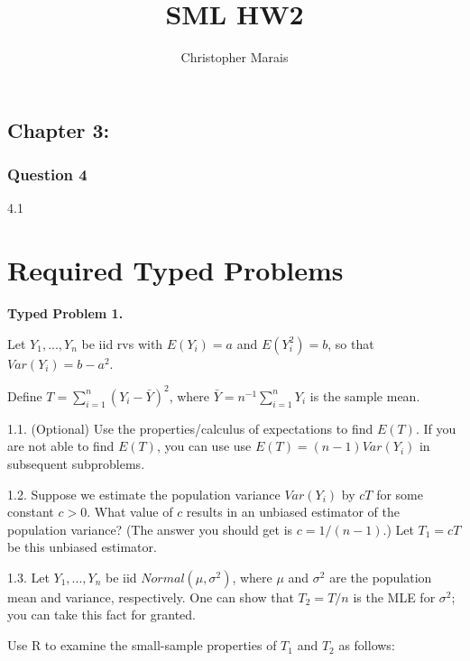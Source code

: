 \documentclass[
  11pt,
]{article}
\title{SML HW2}
\author{Christopher Marais}
\date{}
\begin{document}
\maketitle

\hypertarget{chapter-3}{%
\subsection{Chapter 3:}\label{chapter-3}}

\hypertarget{question-4}{%
\subsubsection{Question 4}\label{question-4}}

4.1

\hypertarget{required-typed-problems}{%
\section{Required Typed Problems}\label{required-typed-problems}}

\textbf{Typed Problem 1.}

Let \(Y_1,...,Y_n\) be iid rvs with \(E(Y_i)=a\) and \(E(Y_i^2)=b\), so
that \(Var(Y_i)=b-a^2\).

Define \(T = \sum_{i=1}^n (Y_i-\bar{Y})^2\), where
\(\bar{Y} = n^{-1}\sum_{i=1}^n Y_i\) is the sample mean.

1.1. (Optional) Use the properties/calculus of expectations to find
\(E(T)\). If you are not able to find \(E(T)\), you can use use
\(E(T) = (n-1)Var(Y_i)\) in subsequent subproblems.

1.2. Suppose we estimate the population variance \(Var(Y_i)\) by \(cT\)
for some constant \(c>0\). What value of \(c\) results in an unbiased
estimator of the population variance? (The answer you should get is
\(c=1/(n-1)\).) Let \(T_1 = cT\) be this unbiased estimator.

1.3. Let \(Y_1,...,Y_n\) be iid \(Normal(\mu,\sigma^2)\), where \(\mu\)
and \(\sigma^2\) are the population mean and variance, respectively. One
can show that \(T_2 = T/n\) is the MLE for \(\sigma^2\); you can take
this fact for granted.

Use R to examine the small-sample properties of \(T_1\) and \(T_2\) as
follows:
\end{document}
